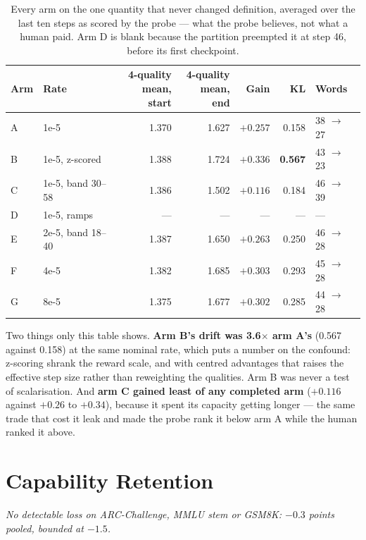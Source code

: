 \documentclass[11pt]{article}
\newcommand{\qual}[1]{\textsf{#1}}
\newcommand{\claim}[1]{\vspace{-7pt}\par{\small\itshape #1}\par\vspace{3pt}}
\begin{document}
\begin{table}[h]
\centering
\begin{tabular}{llrrrrl}
\toprule
\textbf{Arm} & \textbf{Rate} & \shortstack{\textbf{4-quality}\\\textbf{mean, start}}
& \shortstack{\textbf{4-quality}\\\textbf{mean, end}} & \textbf{Gain}
& \textbf{KL} & \textbf{Words} \\
\midrule
A & 1e-5 & 1.370 & 1.627 & $+0.257$ & 0.158 & 38 $\rightarrow$ 27 \\
B & 1e-5, z-scored & 1.388 & 1.724 & $+0.336$ & \textbf{0.567} & 43 $\rightarrow$ 23 \\
C & 1e-5, band 30--58 & 1.386 & 1.502 & $+0.116$ & 0.184 & 46 $\rightarrow$ 39 \\
D & 1e-5, ramps & --- & --- & --- & --- & --- \\
E & 2e-5, band 18--40 & 1.387 & 1.650 & $+0.263$ & 0.250 & 46 $\rightarrow$ 28 \\
F & 4e-5 & 1.382 & 1.685 & $+0.303$ & 0.293 & 45 $\rightarrow$ 28 \\
G & 8e-5 & 1.375 & 1.677 & $+0.302$ & 0.285 & 44 $\rightarrow$ 28 \\
\bottomrule
\end{tabular}
\caption{Every arm on the one quantity that never changed definition, averaged over the last ten steps as
scored by the probe --- what the probe believes, not what a human paid. Arm D is blank because the partition
preempted it at step 46, before its first checkpoint.}
\label{tab:allarms}
\end{table}

Two things only this table shows. \textbf{Arm B's drift was 3.6$\times$ arm A's} (0.567 against 0.158) at
the same nominal rate, which puts a number on the confound: z-scoring shrank the reward scale, and with
centred advantages that raises the effective step size rather than reweighting the qualities. Arm B was
never a test of scalarisation. And \textbf{arm C gained least of any completed arm} ($+0.116$ against
$+0.26$ to $+0.34$), because it spent its capacity getting longer --- the same trade that cost it
\qual{leak} and made the probe rank it below arm A while the human ranked it above.

\section{Capability Retention}
\label{sec:academic}
\claim{No detectable loss on ARC-Challenge, MMLU stem or GSM8K: $-0.3$ points pooled, bounded at $-1.5$.}
\end{document}
